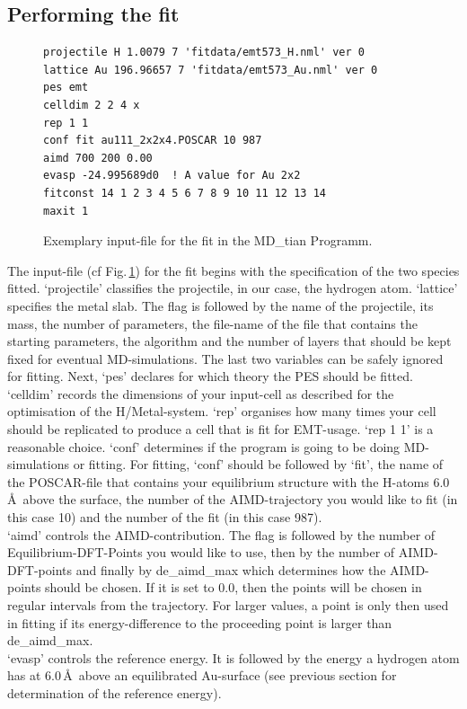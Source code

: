 \documentclass[11pt,oneside,a4paper, captions=nooneline, headsepline]{article}%
\begin{document}
\subsection{Performing the fit}
\begin{figure}[H!!!]
\begin{verbatim}
projectile H 1.0079 7 'fitdata/emt573_H.nml' ver 0
lattice Au 196.96657 7 'fitdata/emt573_Au.nml' ver 0
pes emt
celldim 2 2 4 x
rep 1 1
conf fit au111_2x2x4.POSCAR 10 987
aimd 700 200 0.00
evasp -24.995689d0  ! A value for Au 2x2
fitconst 14 1 2 3 4 5 6 7 8 9 10 11 12 13 14
maxit 1
\end{verbatim}
\caption{Exemplary input-file for the fit in the MD\_tian Programm.}
\label{Mdtianfit}
\end{figure}
The input-file (cf Fig.\,\ref{Mdtianfit}) for the fit begins with the specification of the two species fitted. `projectile' classifies the projectile, in our case, the hydrogen atom. `lattice' specifies the metal slab. The flag is followed by the name of the projectile, its mass, the number of parameters, the file-name of the file that contains the starting parameters, the algorithm and the number of layers that should be kept fixed for eventual MD-simulations. The last two variables can be safely ignored for fitting. Next, `pes' declares for which theory the PES should be fitted. `celldim' records the dimensions of your input-cell as described for the optimisation of the H/Metal-system. `rep' organises how many times your cell should be replicated to produce a cell that is fit for EMT-usage. `rep 1 1' is a reasonable choice. 
`conf' determines if the program is going to be doing MD-simulations or fitting. For fitting, `conf' should be followed by `fit', the name of the POSCAR-file that contains your equilibrium structure with the H-atoms 6.0\,\AA~above the surface, the number of the AIMD-trajectory you would like to fit (in this case 10) and the number of the fit (in this case 987).\\
`aimd' controls the AIMD-contribution. The flag is followed by the number of Equilibrium-DFT-Points you would like to use, then by the number of AIMD-DFT-points and finally by de\_aimd\_max which determines how the AIMD-points should be chosen. If it is set to 0.0, then the points will be chosen in regular intervals from the trajectory. For larger values, a point is only then used in fitting if its energy-difference to the proceeding point is larger than de\_aimd\_max.\\
`evasp' controls the reference energy. It is followed by the energy a hydrogen atom has at 6.0\,\AA~above an equilibrated Au-surface (see previous section for determination of the reference energy).\\
\end{document}
